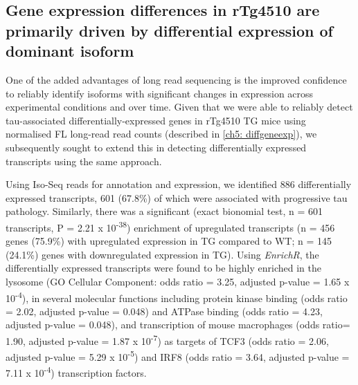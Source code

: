 \clearpage
\subsection{Gene expression differences in rTg4510 are primarily driven by differential expression of dominant isoform}
One of the added advantages of long read sequencing is the improved confidence to reliably identify isoforms with significant changes in expression across experimental conditions and over time. Given that we were able to reliably detect tau-associated differentially-expressed genes in rTg4510 TG mice using normalised FL long-read read counts (described in \cref{ch5: diffgeneexp}), we subsequently sought to extend this in detecting differentially expressed transcripts using the same approach. 

Using Iso-Seq reads for annotation and expression, we identified 886 differentially expressed transcripts, 601 (67.8\%) of which were associated with progressive tau pathology. Similarly, there was a significant (exact bionomial test, n = 601 transcripts, P = 2.21 x 10\textsuperscript{-38}) enrichment of upregulated transcripts (n = 456 genes (75.9\%) with upregulated expression in TG compared to WT; n = 145 (24.1\%) genes with downregulated expression in TG). Using \textit{EnrichR}, the differentially expressed transcripts were found to be highly enriched in the lysosome (GO Cellular Component: odds ratio = 3.25, adjusted p-value = 1.65 x 10\textsuperscript{-4}), in several molecular functions including protein kinase binding (odds ratio = 2.02, adjusted p-value = 0.048) and ATPase binding (odds ratio = 4.23, adjusted p-value = 0.048), and transcription of mouse macrophages (odds ratio= 1.90, adjusted p-value = 1.87 x 10\textsuperscript{-7}) as targets of TCF3 (odds ratio = 2.06, adjusted p-value = 5.29 x 10\textsuperscript{-5}) and IRF8 (odds ratio = 3.64, adjusted p-value = 7.11 x 10\textsuperscript{-4}) transcription factors.  


